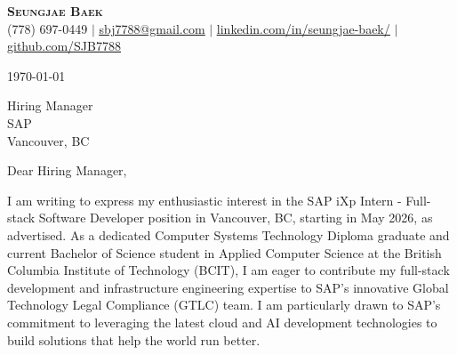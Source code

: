 \documentclass[letterpaper,11pt]{article}
\begin{document}
\begin{center}
\textbf{\Huge \scshape Seungjae Baek} \\ \vspace{1pt}
\small (778) 697-0449 $|$ \href{mailto:sbj7788@gmail.com}{\underline{sbj7788@gmail.com}} $|$
\href{https://linkedin.com/in/seungjae-baek/}{\underline{linkedin.com/in/seungjae-baek/}} $|$
\href{https://github.com/SJB7788}{\underline{github.com/SJB7788}}
\end{center}

\vspace{20pt}
\today

\vspace{20pt}
Hiring Manager \\
SAP \\
Vancouver, BC \\
\vspace{20pt}

Dear Hiring Manager, \\
\vspace{10pt}

I am writing to express my enthusiastic interest in the SAP iXp Intern - Full-stack Software Developer position in Vancouver, BC, starting in May 2026, as advertised. As a dedicated Computer Systems Technology Diploma graduate and current Bachelor of Science student in Applied Computer Science at the British Columbia Institute of Technology (BCIT), I am eager to contribute my full-stack development and infrastructure engineering expertise to SAP's innovative Global Technology Legal Compliance (GTLC) team. I am particularly drawn to SAP's commitment to leveraging the latest cloud and AI development technologies to build solutions that help the world run better.
\vspace{10pt}
\end{document}
